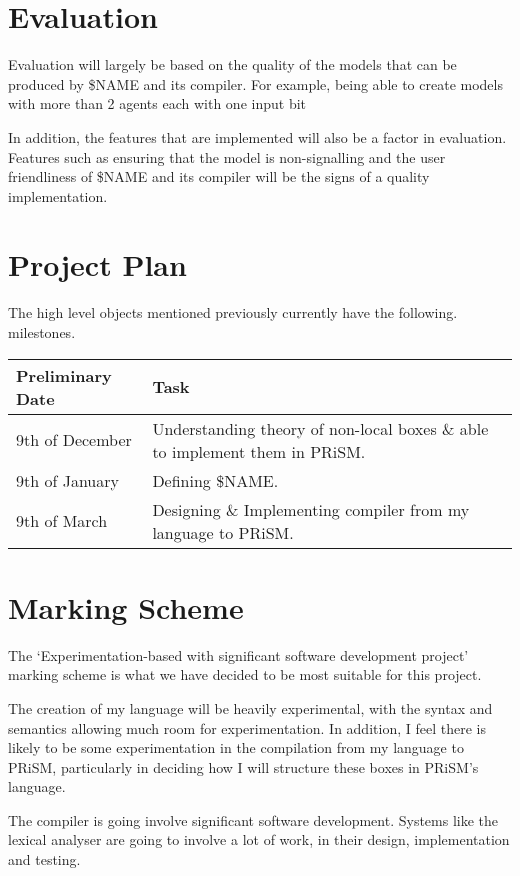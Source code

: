 \documentclass[11pt, a4paper]{article}
\begin{document}

\section{Evaluation} %
\label{sec:evaluation}

Evaluation will largely be based on the quality of the models that can be
produced by \$NAME and its compiler. For example, being able to create models
with more than 2 agents each with one input bit 

In addition, the features that are implemented will also be a factor in
evaluation. Features such as ensuring that the model is non-signalling and
the user friendliness of \$NAME and its compiler will be the signs of a quality 
implementation.


\section{Project Plan} %
\label{sec:project_plan}
The high level objects mentioned previously currently have the following.
milestones.

\begin{center}
    \begin{tabular}{l | p{7.5cm}}
        Preliminary Date & Task \\
        \hline
        9th of December & Understanding theory of non-local boxes \& able to
        implement them in PRiSM. \\

        9th of January & Defining \$NAME. \\

        9th of March & Designing \& Implementing compiler from my language to
        PRiSM. \\
\end{tabular}
\end{center}


\section{Marking Scheme} %
\label{sec:marking_scheme}
The `Experimentation-based with significant software development project'
marking scheme is what we have decided to be most suitable for this project.

The creation of my language will be heavily experimental, with the syntax and
semantics allowing much room for experimentation. In addition, I feel there is
likely to be some experimentation in the compilation from my language to PRiSM,
particularly in deciding how I will structure these boxes in PRiSM's language.

The compiler is going involve significant software development. Systems like the
lexical analyser are going to involve a lot of work, in their design,
implementation and testing. 

\newpage
\printbibliography
\end{document}
